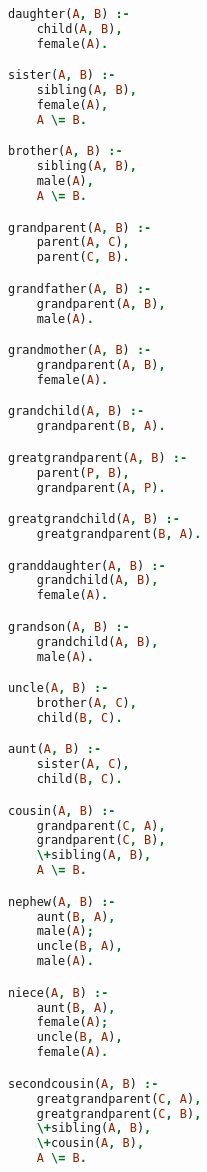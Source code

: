 \documentclass[11pt,letterpaper]{article}
\begin{document}
\begin{lstlisting}[language=Prolog]
daughter(A, B) :-
    child(A, B),
    female(A).

sister(A, B) :-
    sibling(A, B),
    female(A),
    A \= B.

brother(A, B) :-
    sibling(A, B),
    male(A),
    A \= B.

grandparent(A, B) :-
    parent(A, C),
    parent(C, B).

grandfather(A, B) :-
    grandparent(A, B),
    male(A).

grandmother(A, B) :-
    grandparent(A, B),
    female(A).

grandchild(A, B) :-
    grandparent(B, A).

greatgrandparent(A, B) :-
    parent(P, B),
    grandparent(A, P).

greatgrandchild(A, B) :-
    greatgrandparent(B, A).

granddaughter(A, B) :-
    grandchild(A, B),
    female(A).

grandson(A, B) :-
    grandchild(A, B),
    male(A).

uncle(A, B) :-
    brother(A, C),
    child(B, C).

aunt(A, B) :-
    sister(A, C),
    child(B, C).

cousin(A, B) :-
    grandparent(C, A),
    grandparent(C, B),
    \+sibling(A, B),
    A \= B.

nephew(A, B) :-
    aunt(B, A),
    male(A);
    uncle(B, A),
    male(A).

niece(A, B) :-
    aunt(B, A),
    female(A);
    uncle(B, A),
    female(A).

secondcousin(A, B) :-
    greatgrandparent(C, A),
    greatgrandparent(C, B),
    \+sibling(A, B),
    \+cousin(A, B),
    A \= B.

\end{lstlisting}
\end{document}
